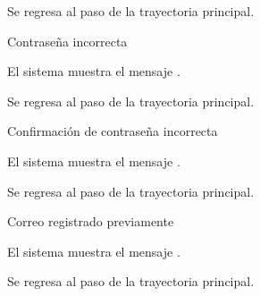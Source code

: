{\begin{trayectoriaAlternativa}
    \item Se regresa al paso  de la trayectoria
      principal.

  \end{trayectoriaAlternativa}


  \begin{trayectoriaAlternativa}
    {Contraseña incorrecta}

    \item El sistema muestra el mensaje
      .

    \item Se regresa al paso  de la trayectoria
      principal.

  \end{trayectoriaAlternativa}


  \begin{trayectoriaAlternativa}
    {Confirmación de contraseña incorrecta}

    \item El sistema muestra el mensaje
      .

    \item Se regresa al paso  de la trayectoria
      principal.

  \end{trayectoriaAlternativa}


  \begin{trayectoriaAlternativa}
    {Correo registrado previamente}

    \item El sistema muestra el mensaje
      .

    \item Se regresa al paso  de la trayectoria
      principal.

  \end{trayectoriaAlternativa}

}
